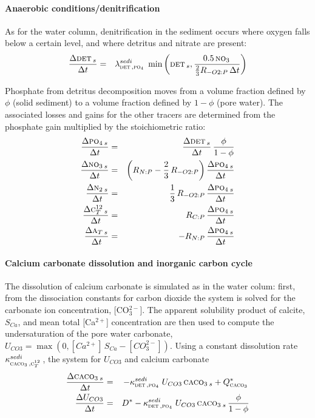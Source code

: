 \documentclass[11pt,a4paper,fleqn,twoside]{article}
\def\pho{\text{\textsc{po$_4$}}\,}
\def\nit{\text{\textsc{no$_3$}}\,}
\def\ntwo{\text{\textsc{n$_2$}}\,}
\def\car{\text{\textsc{c$_T^{12}$}}\,}
\def\alk{\text{\textsc{a$_T$}}\,}
\def\det{\text{\textsc{det}}\,}
\def\cal{\text{\textsc{caco$_3$}}\,}
\begin{document}
\paragraph{Anaerobic conditions/denitrification} As for the water column,
denitrification in the sediment occurs where oxygen falls  below a certain
level, and where detritus and nitrate are present:
\begin{eqnarray}
\frac{\Delta \det_s}{\Delta t} & = & \lambda_{\det,\pho}^{sedi} \,
\min\left(\det_s ,\frac{0.5\,\nit}{\frac{2}{3} R_{-O2:P} \, \Delta t}  \right)
\end{eqnarray}

Phosphate from detritus decomposition moves from a volume fraction 
defined by $\phi$ (solid sediment) to a volume fraction defined
by $1-\phi$ (pore water). The associated losses and gains for the other tracers are determined from
the phosphate gain multiplied by the stoichiometric ratio:
\begin{eqnarray}
\frac{\Delta \pho_s}{\Delta t} & = & \frac{\Delta \det_s}{\Delta t} \, \frac{\phi}{1-\phi}\\
\frac{\Delta \nit_s}{\Delta t} & = &  \left(R_{N:P} - \frac{2}{3} \,
R_{-O2:P}\right)  \frac{\Delta \pho_s}{\Delta t} \\
\frac{\Delta \ntwo_s}{\Delta t} & = & \frac{1}{3} \,R_{-O2:P} \, \frac{\Delta
\pho_s}{\Delta t}\\
\frac{\Delta \car_s}{\Delta t} & = & R_{C:P} \, \frac{\Delta \pho_s}{\Delta t}\\
\frac{\Delta \alk_s}{\Delta t} & = & - R_{N:P} \, \frac{\Delta \pho_s}{\Delta t}
\end{eqnarray}


\paragraph{Calcium carbonate dissolution and inorganic carbon cycle} The
dissolution of calcium carbonate is simulated as in the water colum: first,
from the dissociation constants for carbon dioxide the system  is solved for
the carbonate ion concentration, [CO$_3^{2-}$]. The apparent solubility product
of calcite, $S_{Ca}$, and mean total [Ca$^{2+}$] concentration are then used to
compute the undersaturation of the pore water carbonate,  $U_{CO3}=\max
\left(0, [Ca^{2+}]\,S_{Ca} - [CO_3^{2-}]\right)$. Using a constant
dissolution rate $\kappa^{sedi}_{\cal,\car}$, the system for $U_{CO3}$ and
calcium carbonate 
\begin{eqnarray}
\frac{\Delta \cal_s}{\Delta t}& = &  -\kappa^{sedi}_{\det,\pho} \, U_{CO3} \, \cal_s  + Q^*_\cal \label{dglcal}\\
\frac{\Delta U_{CO3}}{\Delta t} & = & D^* - \kappa^{sedi}_{\det,\pho} \, U_{CO3}\, \cal_s \, \frac{\phi}{1-\phi} \label{dglco3}
\end{eqnarray}
\end{document}
